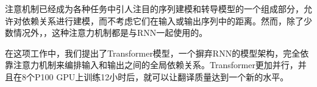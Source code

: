 
注意机制已经成为各种任务中引人注目的序列建模和转导模型的一个组成部分，允许对依赖关系进行建模，而不考虑它们在输入或输出序列中的距离\citep{bahdanau2014neural, structuredAttentionNetworks}。然而，除了少数情况外，\citep{decomposableAttnModel}，这种注意力机制都是与RNN一起使用的。



在这项工作中，我们提出了Transformer模型，一个摒弃RNN的模型架构，完全依靠注意力机制来编排输入和输出之间的全局依赖关系。Transformer更加并行，并且在8个P100 GPU上训练12小时后，就可以让翻译质量达到一个新的水平。


